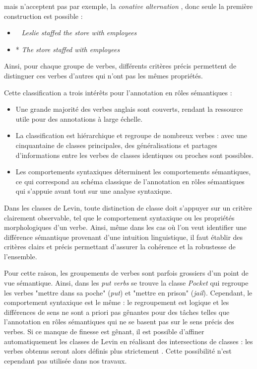 mais n'acceptent pas par exemple, la \textit{conative alternation}
\citep[p.~41]{levin1993english}, donc seule la première construction est
possible :

\begin{itemize}
    \item ~ \textit{Leslie staffed the store with employees}
    \item * \textit{The store staffed with employees}
\end{itemize}

Ainsi, pour chaque groupe de verbes, différents critères précis permettent de
distinguer ces verbes d'autres qui n'ont pas les mêmes propriétés.

Cette classification a trois intérêts pour l'annotation en rôles sémantiques :

\begin{itemize}

    \item Une grande majorité des verbes anglais sont couverts, rendant la
    ressource utile pour des annotations à large échelle.

    \item La classification est hiérarchique et regroupe de nombreux verbes :
    avec une cinquantaine de classes principales, des généralisations et
    partages d'informations entre les verbes de classes identiques ou proches
    sont possibles.

    \item Les comportements syntaxiques déterminent les comportements
    sémantiques, ce qui correspond au schéma classique de l'annotation en rôles
    sémantiques qui s'appuie avant tout sur une analyse syntaxique.

\end{itemize}

Dans les classes de Levin, toute distinction de classe doit s'appuyer sur un
critère clairement observable, tel que le comportement syntaxique ou les
propriétés morphologiques d'un verbe. Ainsi, même dans les cas où l'on veut
identifier une différence sémantique provenant d'une intuition linguistique, il
faut établir des critères clairs et précis permettant d'assurer la cohérence et
la robustesse de l'ensemble.

Pour cette raison, les groupements de verbes sont parfois grossiers d'un point
de vue sémantique. Ainsi, dans les \textit{put verbs} se trouve la classe
\textit{Pocket} qui regroupe les verbes "mettre dans sa poche" (\textit{put}) et
"mettre en prison" (\textit{jail}). Cependant, le comportement syntaxique est le
même : le regroupement est logique et les différences de sens ne sont a priori
pas gênantes pour des tâches telles que l'annotation en rôles sémantiques qui
ne se basent pas sur le sens précis des verbes. Si ce manque de finesse est
gênant, il est possible d'affiner automatiquement les classes de Levin en
réalisant des intersections de classes : les verbes obtenus seront alors
définis plus strictement \citep{dang1998investigating}. Cette possibilité n'est
cependant pas utilisée dans nos travaux.

